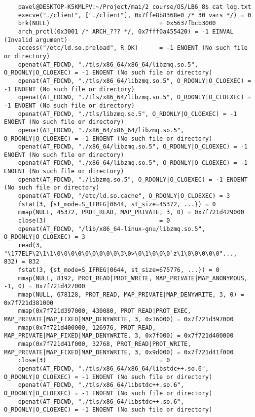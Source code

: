 \documentclass[pdf, unicode, 12pt, a4paper,oneside,fleqn]{article}
\begin{document}
{\tiny
\begin{verbatim}
    pavel@DESKTOP-K5KMLPV:~/Project/mai/2_course/OS/LB6_8$ cat log.txt
    execve("./client", ["./client"], 0x7ffe8b8368e0 /* 30 vars */) = 0
    brk(NULL)                               = 0x5637fbcb3000
    arch_prctl(0x3001 /* ARCH_??? */, 0x7fff0a455420) = -1 EINVAL (Invalid argument)
    access("/etc/ld.so.preload", R_OK)      = -1 ENOENT (No such file or directory)
    openat(AT_FDCWD, "./tls/x86_64/x86_64/libzmq.so.5", O_RDONLY|O_CLOEXEC) = -1 ENOENT (No such file or directory)
    openat(AT_FDCWD, "./tls/x86_64/libzmq.so.5", O_RDONLY|O_CLOEXEC) = -1 ENOENT (No such file or directory)
    openat(AT_FDCWD, "./tls/x86_64/libzmq.so.5", O_RDONLY|O_CLOEXEC) = -1 ENOENT (No such file or directory)
    openat(AT_FDCWD, "./tls/libzmq.so.5", O_RDONLY|O_CLOEXEC) = -1 ENOENT (No such file or directory)
    openat(AT_FDCWD, "./x86_64/x86_64/libzmq.so.5", O_RDONLY|O_CLOEXEC) = -1 ENOENT (No such file or directory)
    openat(AT_FDCWD, "./x86_64/libzmq.so.5", O_RDONLY|O_CLOEXEC) = -1 ENOENT (No such file or directory)
    openat(AT_FDCWD, "./x86_64/libzmq.so.5", O_RDONLY|O_CLOEXEC) = -1 ENOENT (No such file or directory)
    openat(AT_FDCWD, "./libzmq.so.5", O_RDONLY|O_CLOEXEC) = -1 ENOENT (No such file or directory)
    openat(AT_FDCWD, "/etc/ld.so.cache", O_RDONLY|O_CLOEXEC) = 3
    fstat(3, {st_mode=S_IFREG|0644, st_size=45372, ...}) = 0
    mmap(NULL, 45372, PROT_READ, MAP_PRIVATE, 3, 0) = 0x7f721d429000
    close(3)                                = 0
    openat(AT_FDCWD, "/lib/x86_64-linux-gnu/libzmq.so.5", O_RDONLY|O_CLOEXEC) = 3
    read(3, "\177ELF\2\1\1\0\0\0\0\0\0\0\0\0\3\0>\0\1\0\0\0`z\1\0\0\0\0\0"..., 832) = 832
    fstat(3, {st_mode=S_IFREG|0644, st_size=675776, ...}) = 0
    mmap(NULL, 8192, PROT_READ|PROT_WRITE, MAP_PRIVATE|MAP_ANONYMOUS, -1, 0) = 0x7f721d427000
    mmap(NULL, 678128, PROT_READ, MAP_PRIVATE|MAP_DENYWRITE, 3, 0) = 0x7f721d381000
    mmap(0x7f721d397000, 430080, PROT_READ|PROT_EXEC, MAP_PRIVATE|MAP_FIXED|MAP_DENYWRITE, 3, 0x16000) = 0x7f721d397000
    mmap(0x7f721d400000, 126976, PROT_READ, MAP_PRIVATE|MAP_FIXED|MAP_DENYWRITE, 3, 0x7f000) = 0x7f721d400000
    mmap(0x7f721d41f000, 32768, PROT_READ|PROT_WRITE, MAP_PRIVATE|MAP_FIXED|MAP_DENYWRITE, 3, 0x9d000) = 0x7f721d41f000
    close(3)                                = 0
    openat(AT_FDCWD, "./tls/x86_64/x86_64/libstdc++.so.6", O_RDONLY|O_CLOEXEC) = -1 ENOENT (No such file or directory)
    openat(AT_FDCWD, "./tls/x86_64/libstdc++.so.6", O_RDONLY|O_CLOEXEC) = -1 ENOENT (No such file or directory)
    openat(AT_FDCWD, "./tls/x86_64/libstdc++.so.6", O_RDONLY|O_CLOEXEC) = -1 ENOENT (No such file or directory)

\end{verbatim}}
\end{document}
